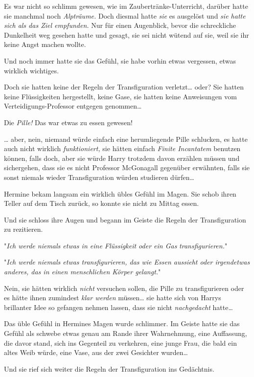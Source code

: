 {Es war nicht so schlimm gewesen, wie im Zaubertränke-Unterricht, darüber hatte sie manchmal noch \emph{Alpträume.} Doch diesmal hatte \emph{sie} es ausgelöst und \emph{sie hatte sich als das Ziel empfunden.} Nur für einen Augenblick, bevor die schreckliche Dunkelheit weg gesehen hatte und gesagt, sie sei nicht wütend auf sie, weil sie ihr keine Angst machen wollte.

Und noch immer hatte sie das Gefühl, sie habe vorhin etwas vergessen, etwas wirklich wichtiges.

Doch sie hatten keine der Regeln der Transfiguration verletzt… oder? Sie hatten keine Flüssigkeiten hergestellt, keine Gase, sie hatten keine Anweisungen vom Verteidigungs-Professor entgegen genommen…

Die \emph{Pille!} Das war etwas zu essen gewesen!

… aber, nein, niemand würde einfach eine herumliegende Pille schlucken, es hatte auch nicht wirklich \emph{funktioniert,} sie hätten einfach \emph{Finite Incantatem} benutzen können, falls doch, aber sie würde Harry trotzdem davon erzählen müssen und sichergehen, dass sie es nicht Professor McGonagall gegenüber erwähnten, falls sie sonst niemals wieder Transfiguration würden studieren dürfen…

Hermine bekam langsam ein wirklich übles Gefühl im Magen. Sie schob ihren Teller auf dem Tisch zurück, so konnte sie nicht zu Mittag essen.

Und sie schloss ihre Augen und begann im Geiste die Regeln der Transfiguration zu rezitieren.

"\emph{Ich werde niemals etwas in eine Flüssigkeit oder ein Gas} \emph{transfigurieren.}"

"\emph{Ich werde niemals etwas transfigurieren, das wie Essen aussieht oder irgendetwas anderes, das in einen menschlichen Körper gelangt.}"

Nein, sie hätten wirklich \emph{nicht} versuchen sollen, die Pille zu transfigurieren oder es hätte ihnen zumindest \emph{klar werden} müssen… sie hatte sich von Harrys brillanter Idee so gefangen nehmen lassen, dass sie nicht \emph{nachgedacht} hatte…

Das üble Gefühl in Hermines Magen wurde schlimmer. Im Geiste hatte sie das Gefühl als schwebe etwas genau am Rande ihrer Wahrnehmung, eine Auffassung, die davor stand, sich ins Gegenteil zu verkehren, eine junge Frau, die bald ein altes Weib würde, eine Vase, aus der zwei Gesichter wurden…

Und sie rief sich weiter die Regeln der Transfiguration ins Gedächtnis.

}
